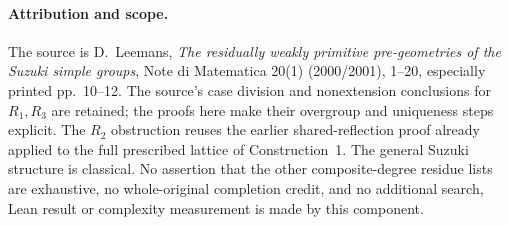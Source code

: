 \documentclass[11pt,a4paper]{article}
\begin{document}
\paragraph{Attribution and scope.}
The source is D.~Leemans, \emph{The residually weakly primitive
pre-geometries of the Suzuki simple groups}, Note di Matematica 20(1)
(2000/2001), 1--20, especially printed pp.~10--12. The source's
case division and nonextension conclusions for $R_1,R_3$ are retained;
the proofs here make their overgroup and uniqueness steps explicit.
The $R_2$ obstruction reuses the earlier shared-reflection proof already
applied to the full prescribed lattice of Construction~1.
The general Suzuki structure is classical. No assertion that the other
composite-degree residue lists are exhaustive, no whole-original
completion credit, and no additional search, Lean result or complexity
measurement is made by this component.
\end{document}
